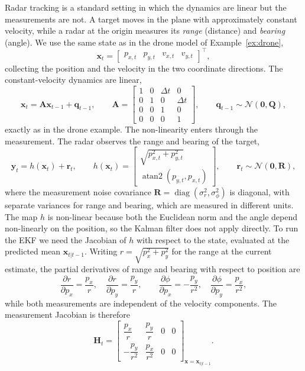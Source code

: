 \begin{example}\label{ex:radar}
Radar tracking is a standard setting in which the dynamics are linear but the measurements are not. A target moves in the plane with approximately constant velocity, while a radar at the origin measures its \emph{range} (distance) and \emph{bearing} (angle). We use the same state as in the drone model of Example~\ref{ex:drone},
\[
    \mathbf{x}_t = \begin{bmatrix} p_{x,t} & p_{y,t} & v_{x,t} & v_{y,t} \end{bmatrix}^{\top},
\]
collecting the position and the velocity in the two coordinate directions. The constant-velocity dynamics are linear,
\[
    \mathbf{x}_t = \mathbf{A}\mathbf{x}_{t-1} + \mathbf{q}_{t-1}, \qquad
    \mathbf{A} = \begin{bmatrix} 1 & 0 & \Delta t & 0 \\ 0 & 1 & 0 & \Delta t \\ 0 & 0 & 1 & 0 \\ 0 & 0 & 0 & 1 \end{bmatrix}, \qquad \mathbf{q}_{t-1} \sim \mathcal{N}(\mathbf{0}, \mathbf{Q}),
\]
exactly as in the drone example. The non-linearity enters through the measurement. The radar observes the range and bearing of the target,
\[
    \mathbf{y}_t = h(\mathbf{x}_t) + \mathbf{r}_t, \qquad
    h(\mathbf{x}_t) = \begin{bmatrix} \sqrt{p_{x,t}^2 + p_{y,t}^2} \\[4pt] \operatorname{atan2}(p_{y,t}, p_{x,t}) \end{bmatrix}, \qquad \mathbf{r}_t \sim \mathcal{N}(\mathbf{0}, \mathbf{R}),
\]
where the measurement noise covariance $\mathbf{R} = \operatorname{diag}(\sigma_r^2, \sigma_\phi^2)$ is diagonal, with separate variances for range and bearing, which are measured in different units. The map $h$ is non-linear because both the Euclidean norm and the angle depend non-linearly on the position, so the Kalman filter does not apply directly. 
\newline To run the EKF we need the Jacobian of $h$ with respect to the state, evaluated at the predicted mean $\mathbf{x}_{t|t-1}$. Writing $r = \sqrt{p_x^2 + p_y^2}$ for the range at the current estimate, the partial derivatives of range and bearing with respect to position are
\[
    \frac{\partial r}{\partial p_x} = \frac{p_x}{r}, \quad
    \frac{\partial r}{\partial p_y} = \frac{p_y}{r}, \qquad
    \frac{\partial \phi}{\partial p_x} = -\frac{p_y}{r^2}, \quad
    \frac{\partial \phi}{\partial p_y} = \frac{p_x}{r^2},
\]
while both measurements are independent of the velocity components. The measurement Jacobian is therefore
\[
    \mathbf{H}_t = \begin{bmatrix} \dfrac{p_x}{r} & \dfrac{p_y}{r} & 0 & 0 \\[8pt] -\dfrac{p_y}{r^2} & \dfrac{p_x}{r^2} & 0 & 0 \end{bmatrix}_{\mathbf{x} = \mathbf{x}_{t|t-1}}.
\]


\end{example}
